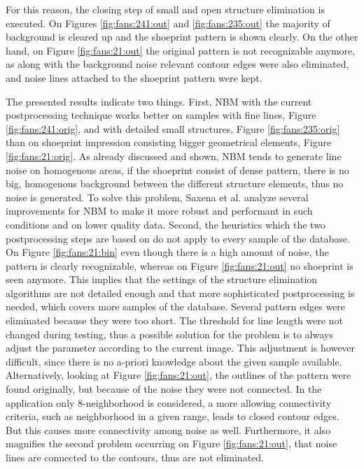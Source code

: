 \documentclass[draft,final]{vutinfth} %
\begin{document}
For this reason, the closing step of small and open structure elimination is executed.
On Figures \ref{fig:fans:241:out} and \ref{fig:fans:235:out} the majority of background is cleared up and the shoeprint pattern is shown clearly.
On the other hand, on Figure \ref{fig:fans:21:out} the original pattern is not recognizable anymore, as along with the background noise relevant contour edges were also eliminated, and noise lines attached to the shoeprint pattern were kept.
\par
The presented results indicate two things.
First, NBM with the current postprocessing technique works better on samples with fine lines, Figure \ref{fig:fans:241:orig}, and with detailed small structures, Figure \ref{fig:fans:235:orig} than on shoeprint impression consisting bigger geometrical elements, Figure \ref{fig:fans:21:orig}.
As already discussed and shown, NBM tends to generate line noise on homogenous areas, if the shoeprint consist of dense pattern, there is no big, homogenous background between the different structure elements, thus no noise is generated.
To solve this problem, Saxena et al. \cite{saxena2019niblack} analyze several improvements for NBM to make it more robust and performant in such conditions and on lower quality data.
Second, the heuristics which the two postprocessing steps are based on do not apply to every sample of the database.
On Figure  \ref{fig:fans:21:bin} even though there is a high amount of noise, the pattern is clearly recognizable, whereas on Figure \ref{fig:fans:21:out} no shoeprint is seen anymore.
This implies that the settings of the structure elimination algorithms are not detailed enough and that more sophisticated postprocessing is needed, which covers more samples of the database.
Several pattern edges were eliminated because they were too short.
The threshold for line length were not changed during testing, thus a possible solution for the problem is to always adjust the parameter according to the current image.
This adjustment is however difficult, since there is no a-priori knowledge about the given sample available.
Alternatively, looking at Figure  \ref{fig:fans:21:out}, the outlines of the pattern were found originally, but because of the noise they were not connected.
In the application only 8-neighborhood is considered, a more allowing connectivity criteria, such as neighborhood in a given range, leads to closed contour edges.
But this causes more connectivity among noise as well.
Furthermore, it also magnifies the second problem occurring on Figure \ref{fig:fans:21:out}, that noise lines are connected to the contours, thus are not eliminated.
\end{document}
